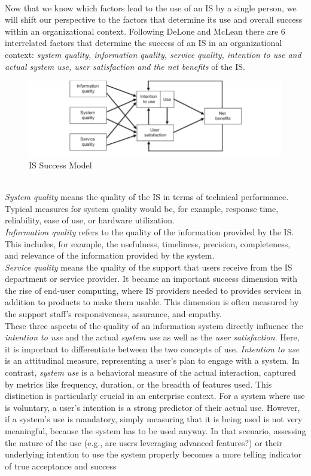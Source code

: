 \documentclass[
	english,
	ruledheaders=section,%
	class=report,%
	thesis={type=bachelor},%
	accentcolor=1b,%
	custommargins=true,%
	marginpar=false,%
	parskip=half-,%
	fontsize=11pt,%
	DIV=14,
]{tudapub}
\begin{document}
\\
Now that we know which factors lead to the use of an IS by a single person, we will shift our perspective to the factors that determine its use and overall success within an organizational context.
Following DeLone and McLean \parencite{DeloneMcLean2003ISSuccessTenYearUpdate} there are 6 interrelated factors that determine the success of an IS in an organizational context: \textit{system quality, information quality, service quality, intention to use and actual system use, user satisfaction and the net benefits} of the IS.\\
\begin{figure}[h!]
    \includegraphics[width=1\linewidth]{images/ISSuccess.png}
    \caption{IS Success Model}
    \label{fig:enter-label}
\end{figure}
\\
\textit{System quality} means the quality of the IS in terms of technical performance. Typical measures for system quality would be, for example, response time, reliability, ease of use, or hardware utilization.\\
\textit{Information quality} refers to the quality of the information provided by the IS. This includes, for example, the usefulness, timeliness, precision, completeness, and relevance of the information provided by the system.\\
\textit{Service quality} means the quality of the support that users receive from the IS department or service provider. It became an important success dimension with the rise of end-user computing, where IS providers needed to provides services in addition to products to make them usable. This dimension is often measured by the support staff's responsiveness, assurance, and empathy.
\\
These three aspects of the quality of an information system directly influence the \textit{intention to use} and the actual \textit{system use} as well as the \textit{user satisfaction}. Here, it is important to differentiate between the two concepts of use. \textit{Intention to use} is an attitudinal measure, representing a user's plan to engage with a system. In contrast, \textit{system use} is a behavioral measure of the actual interaction, captured by metrics like frequency, duration, or the breadth of features used. This distinction is particularly crucial in an enterprise context. For a system where use is voluntary, a user's intention is a strong predictor of their actual use. However, if a system's use is mandatory, simply measuring that it is being used is not very meaningful, because the system has to be used anyway. In that scenario, assessing the nature of the use (e.g., are users leveraging advanced features?) or their underlying intention to use the system properly becomes a more telling indicator of true acceptance and success
\end{document}
